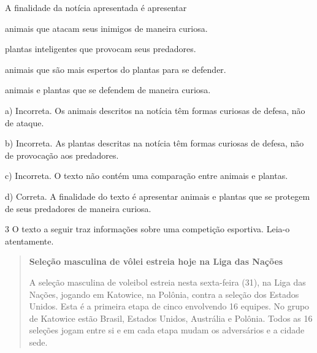 \begin{escolha}
\begin{escolha}
\begin{escolha}

A finalidade da notícia apresentada é apresentar

\begin{escolha}
\item animais que atacam seus inimigos de maneira curiosa.

\item plantas inteligentes que provocam seus predadores.

\item animais que são mais espertos do plantas para se defender.

\item animais e plantas que se defendem de maneira curiosa.
\end{escolha}


a) Incorreta. Os animais descritos na notícia têm formas curiosas de defesa,
não de ataque. 

b) Incorreta. As plantas descritas na notícia têm formas curiosas de defesa,
não de provocação aos predadores. 

c) Incorreta. O texto não contém uma comparação entre animais e plantas.  

d) Correta. A finalidade do texto é apresentar animais e plantas que se 
protegem de seus predadores de maneira curiosa. 

\num{3} O texto a seguir traz informações sobre uma competição esportiva. 
Leia-o atentamente.

\begin{quote}
\textbf{Seleção masculina de vôlei estreia hoje na Liga das Nações}

A seleção masculina de voleibol estreia nesta sexta-feira
(31), na Liga das Nações, jogando em Katowice, na Polônia, contra a 
seleção dos Estados Unidos.
Esta é a primeira etapa de cinco envolvendo 16 equipes. No grupo de 
Katowice estão Brasil, Estados Unidos, Austrália e Polônia. Todos as 16
seleções jogam entre si e em cada etapa mudam os adversários e a cidade 
sede.
\end{quote}


\end{escolha}
\end{escolha}
\end{escolha}
